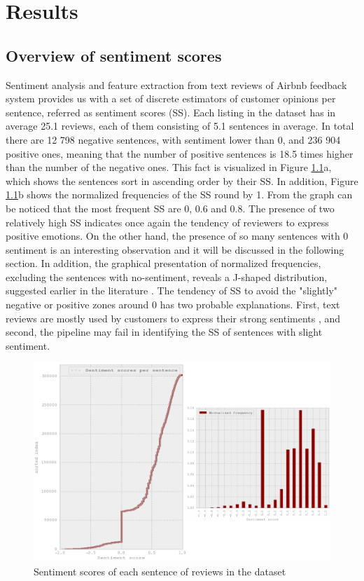 %
%
\let\textcircled=\pgftextcircled
\chapter{Results}
\label{chap:res}
\section{Overview of sentiment scores}
Sentiment analysis and feature extraction from text reviews of Airbnb feedback system provides us with a set of discrete estimators of customer opinions per sentence, referred as sentiment scores (SS). Each listing in the dataset has in average 25.1 reviews, each of them consisting of 5.1 sentences in average. In total there are 12 798 negative sentences, with sentiment lower than 0, and 236 904 positive ones, meaning that the number of positive sentences is 18.5 times higher than the number of the negative ones.  This fact is visualized in Figure \ref{fig:sent}a, which shows the sentences sort in ascending order by their SS. In addition, Figure \ref{fig:sent}b shows the normalized frequencies of the SS round by 1. From the graph can be noticed that the most frequent SS are 0, 0.6 and 0.8. The presence of two relatively high SS indicates once again the tendency of reviewers to express positive emotions. On the other hand, the presence of so many sentences with 0 sentiment is an interesting observation and it will be discussed in the following section. In addition, the graphical presentation of normalized frequencies, excluding the sentences with no-sentiment, reveals a J-shaped distribution, suggested earlier in the literature \cite{hu2009overcoming}. The tendency of SS to avoid the "slightly" negative or positive zones around 0 has two probable explanations. First, text reviews are mostly used by customers to express their strong sentiments \cite{hu2009overcoming, pavlou2006nature}, and second, the pipeline may fail in identifying the SS of sentences with slight sentiment.
\begin{figure}[h!]
\centering
	\includegraphics[height=0.35\textheight]{normalized_sentiment_freq}
%
%
	\caption{Sentiment scores of each sentence of reviews in the dataset}
	\label{fig:sent}
\end{figure}
